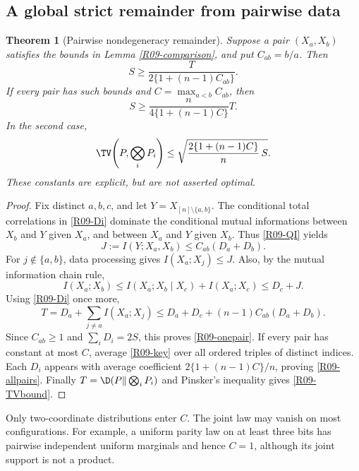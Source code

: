 \documentclass[11pt,a4paper]{article}
\newtheorem{theorem}{Theorem}[section]
\theoremstyle{definition}\newtheorem{definition}[theorem]{Definition}
\theoremstyle{remark}\newtheorem{remark}[theorem]{Remark}
\numberwithin{equation}{section}
\begin{document}
\subsection{A global strict remainder from pairwise data}\label{R09-sec-4}
\begin{theorem}[Pairwise nondegeneracy remainder]\label{R09-quant}
Suppose a pair $(X_a,X_b)$ satisfies the bounds in Lemma \ref{R09-comparison}, and put $C_{ab}=b/a$. Then
\begin{equation}\label{R09-onepair}
 S\ge\frac{T}{2\{1+(n-1)C_{ab}\}}.
\end{equation}
If every pair has such bounds and $C=\max_{a<b}C_{ab}$, then
\begin{equation}\label{R09-allpairs}
 S\ge\frac{n}{4\{1+(n-1)C\}}T.
\end{equation}
In the second case,
\begin{equation}\label{R09-TVbound}
 \TV\!\left(P,\bigotimes_iP_i\right)
 \le\sqrt{\frac{2\{1+(n-1)C\}}{n}\,S}.
\end{equation}
These constants are explicit, but are not asserted optimal.
\end{theorem}
\begin{proof}
Fix distinct $a,b,c$, and let $Y=X_{[n]\setminus\{a,b\}}$. The conditional total correlations in \eqref{R09-Di} dominate the conditional mutual informations between $X_b$ and $Y$ given $X_a$, and between $X_a$ and $Y$ given $X_b$. Thus \eqref{R09-QI} yields
\[
 J:=I(Y;X_a,X_b)\le C_{ab}(D_a+D_b).
\]
For $j\notin\{a,b\}$, data processing gives $I(X_a;X_j)\le J$. Also, by the mutual information chain rule,
\[
 I(X_a;X_b)\le I(X_a;X_b\mid X_c)+I(X_a;X_c)\le D_c+J.
\]
Using \eqref{R09-Di} once more,
\begin{equation}\label{R09-key}
 T=D_a+\sum_{j\ne a}I(X_a;X_j)
 \le D_a+D_c+(n-1)C_{ab}(D_a+D_b).
\end{equation}
Since $C_{ab}\ge1$ and $\sum_iD_i=2S$, this proves \eqref{R09-onepair}. If every pair has constant at most $C$, average \eqref{R09-key} over all ordered triples of distinct indices. Each $D_i$ appears with average coefficient $2\{1+(n-1)C\}/n$, proving \eqref{R09-allpairs}. Finally $T=\D(P\Vert\bigotimes_iP_i)$ and Pinsker's inequality gives \eqref{R09-TVbound}.
\end{proof}

Only two-coordinate distributions enter $C$. The joint law may vanish on most configurations. For example, a uniform parity law on at least three bits has pairwise independent uniform marginals and hence $C=1$, although its joint support is not a product.
\end{document}
